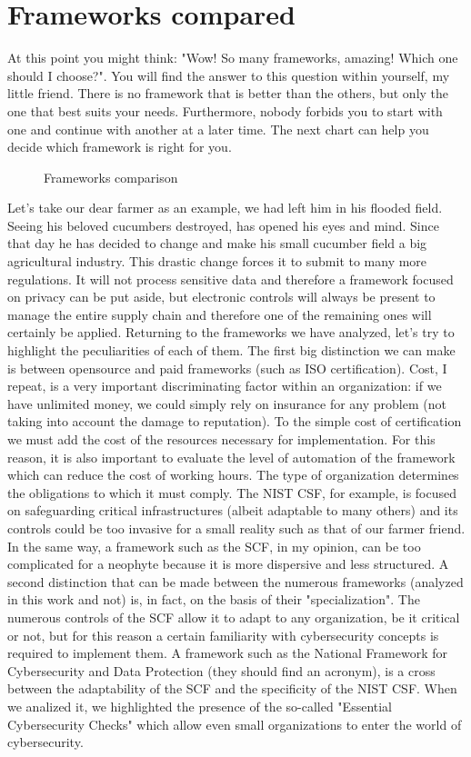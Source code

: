 \section{Frameworks compared}
At this point you might think: "Wow! So many frameworks, amazing! Which one should I choose?". You will find the answer to this question within yourself, my little friend. There is no framework that is better than the others, but only the one that best suits your needs. Furthermore, nobody forbids you to start with one and continue with another at a later time. The next chart can help you decide which framework is right for you.
\begin{figure}[H]
  \centering
  
  \caption{Frameworks comparison}
\end{figure}
\noindent
Let's take our dear farmer as an example, we had left him in his flooded field. Seeing his beloved cucumbers destroyed, has opened his eyes and mind. Since that day he has decided to change and make his small cucumber field a big agricultural industry. This drastic change forces it to submit to many more regulations. It will not process sensitive data and therefore a framework focused on privacy can be put aside, but electronic controls will always be present to manage the entire supply chain and therefore one of the remaining ones will certainly be applied. Returning to the frameworks we have analyzed, let's try to highlight the peculiarities of each of them. The first big distinction we can make is between opensource and paid frameworks (such as ISO certification). Cost, I repeat, is a very important discriminating factor within an organization: if we have unlimited money, we could simply rely on insurance for any problem (not taking into account the damage to reputation). To the simple cost of certification we must add the cost of the resources necessary for implementation. For this reason, it is also important to evaluate the level of automation of the framework which can reduce the cost of working hours.\newline
The type of organization determines the obligations to which it must comply. The NIST CSF, for example, is focused on safeguarding critical infrastructures (albeit adaptable to many others) and its controls could be too invasive for a small reality such as that of our farmer friend. In the same way, a framework such as the SCF, in my opinion, can be too complicated for a neophyte because it is more dispersive and less structured. A second distinction that can be made between the numerous frameworks (analyzed in this work and not) is, in fact, on the basis of their "specialization". The numerous controls of the SCF allow it to adapt to any organization, be it critical or not, but for this reason a certain familiarity with cybersecurity concepts is required to implement them. A framework such as the National Framework for Cybersecurity and Data Protection (they should find an acronym), is a cross between the adaptability of the SCF and the specificity of the NIST CSF. When we analized it, we highlighted the presence of the so-called "Essential Cybersecurity Checks" which allow even small organizations to enter the world of cybersecurity.\newline
